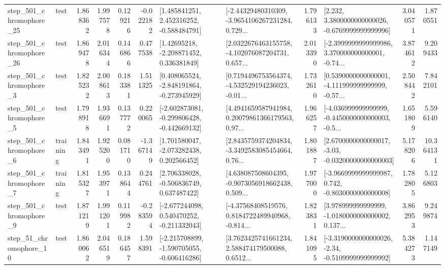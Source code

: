 \begin{tabular}{llrrrrllrlrr}
  step\_501\_chromophore\_25 &      test &      1.868362 &    1.997578 &      0.129216 & -0.022182 &    [1.485841251, 2.452316252, -0.588484791] &  [-2.44329480310309, -3.9654106267231284, 0.729... &       1.796133 &   [2.232, 3.3800000000000026, -0.6769999999999996] &            3.040571 &          1.870551 \\
  step\_501\_chromophore\_26 &      test &      1.869478 &    2.016344 &      0.146866 &  0.477538 &     [1.42695218, -2.208871452, 0.336381849] &  [2.0322676463155758, -4.102076087204731, 0.657... &       2.013390 &  [-2.3999999999999986, 3.370000000000001, -0.74... &            3.874612 &          9.209433 \\
   step\_501\_chromophore\_3 &      test &      1.825232 &    2.008613 &      0.183381 &  1.511325 &   [0.408065524, -2.848191864, -0.273945929] &  [0.7194496753564374, -4.532529194236023, -0.01... &       1.732610 &  [0.5390000000000001, -4.111999999999999, -0.57... &            2.508442 &          7.842101 \\
   step\_501\_chromophore\_5 &      test &      1.798918 &    1.936691 &      0.137772 &  0.220065 &  [-2.602873081, -0.299806428, -0.442669132] &  [4.4941659587941984, 0.20079861366179563, 0.97... &       1.966257 &  [-4.036999999999999, -0.4450000000000003, -0.5... &            1.651809 &          5.596140 \\
   step\_501\_chromophore\_6 &  training &      1.843491 &    1.925200 &      0.081710 & -1.367149 &    [1.701580047, -2.073282438, 0.202566452] &  [2.8435759374204834, -3.3492583085454664, 0.76... &       1.801887 &  [2.6700000000000017, -3.03, -0.03200000000000003] &            5.178206 &         10.364131 \\
   step\_501\_chromophore\_7 &  training &      1.815327 &    1.953971 &      0.138644 &  0.244761 &    [2.706338028, -0.506836749, 0.637487422] &  [4.638087508604395, -0.9073056918662438, 0.509... &       1.977000 &  [-3.9669999999999987, 0.742, -0.8030000000000008] &            1.782805 &          5.126803 \\
   step\_501\_chromophore\_9 &      test &      1.871219 &    1.991201 &      0.119982 & -0.283594 &   [-2.677244098, 0.540470252, -0.211332043] &  [-4.37568408519576, 0.8184722489940968, -0.814... &       1.823831 &  [3.978999999999999, -1.0180000000000002, 0.137... &            3.862953 &          9.249874 \\
   step\_51\_chromophore\_10 &      test &      1.860062 &    2.046519 &      0.186457 &  1.598391 &  [-2.215708899, -1.590705055, -0.606416286] &  [3.7623425741661234, 2.588474179500088, 0.6512... &       1.841095 &  [-3.3190000000000026, -2.34, -0.5109999999999992] &            5.384273 &          1.147149 \\

\end{tabular}
